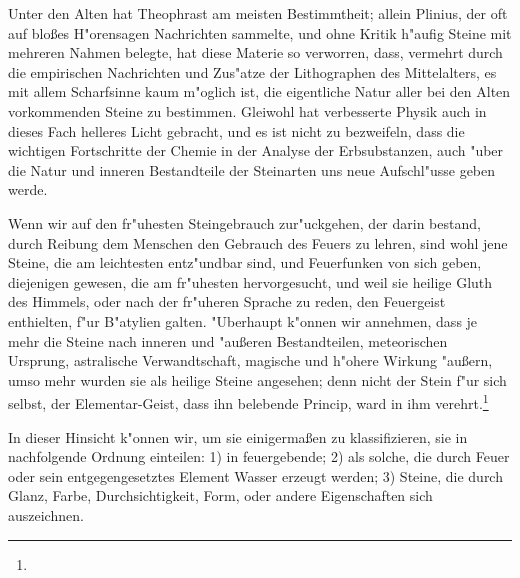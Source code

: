 \documentclass[a4paper, 11pt, oneside, polutonikogreek, german]{article}
\begin{document}
Unter den Alten hat Theophrast am meisten Bestimmtheit; allein Plinius, der oft auf bloßes H"orensagen Nachrichten sammelte, und ohne Kritik h"aufig Steine mit mehreren Nahmen belegte, hat diese Materie so verworren, dass, vermehrt durch die empirischen Nachrichten und Zus"atze der Lithographen des Mittelalters, es mit allem Scharfsinne kaum m"oglich ist, die eigentliche Natur aller bei den Alten vorkommenden Steine zu bestimmen. Gleiwohl hat verbesserte Physik auch in dieses Fach helleres Licht gebracht, und es ist nicht zu bezweifeln, dass die wichtigen Fortschritte der Chemie in der Analyse der Erbsubstanzen, auch "uber die Natur und inneren Bestandteile der Steinarten uns neue Aufschl"usse geben werde.

Wenn wir auf den fr"uhesten Steingebrauch zur"uckgehen, der darin bestand, durch Reibung dem Menschen den Gebrauch des Feuers zu lehren, sind wohl jene Steine, die am leichtesten entz"undbar sind, und Feuerfunken von sich geben, diejenigen gewesen, die am fr"uhesten hervorgesucht, und weil sie heilige Gluth des Himmels, oder nach der fr"uheren Sprache zu reden, den Feuergeist enthielten, f"ur B"atylien galten. "Uberhaupt k"onnen wir annehmen, dass je mehr die Steine nach inneren und "außeren Bestandteilen, meteorischen Ursprung, astralische Verwandtschaft, magische und h"ohere Wirkung "außern, umso mehr wurden sie als heilige Steine angesehen; denn nicht der Stein f"ur sich selbst, der Elementar-Geist, dass ihn belebende Princip, ward in ihm verehrt.\footnote{}

In dieser Hinsicht k"onnen wir, um sie einigermaßen zu klassifizieren, sie in nachfolgende Ordnung einteilen: 1) in feuergebende; 2) als solche, die durch Feuer oder sein entgegengesetztes Element Wasser erzeugt werden; 3) Steine, die durch Glanz, Farbe, Durchsichtigkeit, Form, oder andere Eigenschaften sich auszeichnen.
\end{document}
